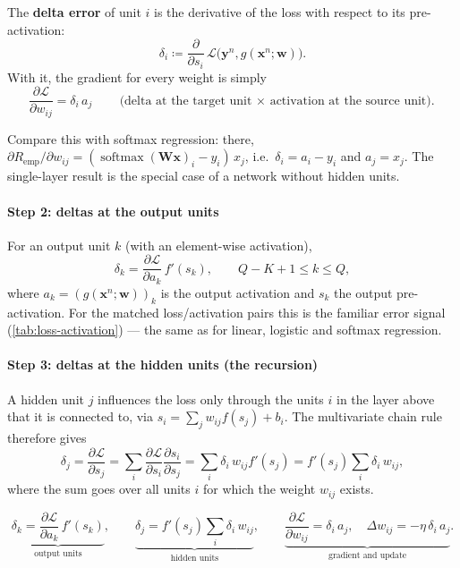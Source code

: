 \documentclass[11pt, oneside]{book}
\newcommand{\pd}[2]{\frac{\partial #1}{\partial #2}}
\newcommand{\loss}{\mathcal{L}}          %
\newcommand{\params}{\boldsymbol{\theta}}   %
\DeclareMathOperator{\softmax}{softmax}
\newcommand{\bx}{\bm{x}}        \newcommand{\by}{\bm{y}}
\newcommand{\bw}{\bm{w}}        \newcommand{\bW}{\bm{W}}
\newcommand{\Remp}{R_{\mathrm{emp}}}     %
\begin{document}
\begin{defbox}[title={Delta error}]
The \textbf{delta error} of unit $i$ is the derivative of the loss with
respect to its pre-activation:
\[
  \delta_i \coloneqq \pd{}{s_i}\,\loss\bigl(\by^n, g(\bx^n; \bw)\bigr).
\]
With it, the gradient for every weight is simply
\[
  \pd{\loss}{w_{ij}} = \delta_i\, a_j
  \qquad\text{(delta at the target unit $\times$ activation at the source unit).}
\]
\end{defbox}

Compare this with softmax regression: there,
$\partial\Remp / \partial w_{ij} = (\softmax(\bW\bx)_i - y_i)\,x_j$, i.e.\
$\delta_i = a_i - y_i$ and $a_j = x_j$. The single-layer result is the
special case of a network without hidden units.

\paragraph{Step 2: deltas at the output units}
For an output unit $k$ (with an element-wise activation),
\[
  \delta_k = \pd{\loss}{a_k}\, f'(s_k),
  \qquad Q - K + 1 \le k \le Q,
\]
where $a_k = (g(\bx^n;\bw))_k$ is the output activation and $s_k$ the
output pre-activation. For the matched loss/activation pairs this is the
familiar error signal (\cref{tab:loss-activation}) --- the same as for
linear, logistic and softmax regression.

\paragraph{Step 3: deltas at the hidden units (the recursion)}
A hidden unit $j$ influences the loss only through the units $i$ in the
layer above that it is connected to, via
$s_i = \sum_j w_{ij} f(s_j) + b_i$. The multivariate chain rule therefore
gives
\[
  \delta_j = \pd{\loss}{s_j} = \sum_i \pd{\loss}{s_i}\pd{s_i}{s_j}
  = \sum_i \delta_i\, w_{ij} f'(s_j)
  = f'(s_j)\sum_i \delta_i\, w_{ij},
\]
where the sum goes over all units $i$ for which the weight $w_{ij}$ exists.

\begin{thmbox}[title={Backpropagation (unit-wise)}]
\[
  \underbrace{\delta_k = \pd{\loss}{a_k}\,f'(s_k)}_{\text{output units}},
  \qquad
  \underbrace{\delta_j = f'(s_j)\sum_i \delta_i\, w_{ij}}_{\text{hidden units}},
  \qquad
  \underbrace{\pd{\loss}{w_{ij}} = \delta_i\, a_j, \quad
  \Delta w_{ij} = -\eta\,\delta_i\, a_j}_{\text{gradient and update}} .
\]
\end{thmbox}
\end{document}
